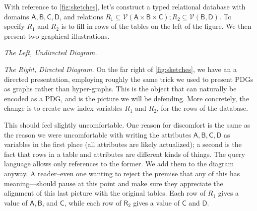 \documentclass{article}
\theoremstyle{plain}
\theoremstyle{definition}
\theoremstyle{remark}
\newcommand{\var}[1]{\mathsf{#1}}
\begin{document}
\begin{example}
    With reference to \cref{fig:sketches}, let's construct a typed relational database with domains $\var{A, B, C, D}$, and relations $R_1 \subseteq \mathcal V(\var{A\times B \times C}); R_2 \subseteq \mathcal V(\var{B, D})$. To specify $R_1$ and $R_2$ is to fill in rows of the tables on the left of the figure. We then present two graphical illustrations.
    
    \textit{The Left, Undirected Diagram.}

    

    

    
    \textit{The Right, Directed Diagram.} On the far right of \cref{fig:sketches}, we have an a directed presentation, employing roughly the same trick we used to present PDGs as graphs rather than hyper-graphs. This is the object that can naturally be encoded as a PDG, and is the picture we will be defending. More concretely, the change is to create new index variables $R_1$ and $R_2$, for the rows of the database. 
    
    This should feel slightly uncomfortable. One reason for discomfort is the same as the reason we were uncomfortable with writing the attributes $\var{A,B,C,D}$ as variables in the first place (all attributes are likely actualized); a second is the fact that rows in a table and attributes are different kinds of things. The query language allows only references to the former. We add them to the diagram anyway.
    A reader--even one wanting to reject the premise that any of this has meaning---should pause at this point and make sure they appreciate the alignment of this last picture with the original tables. Each row of $R_1$ gives a value of $\var{A,B}$, and $\var C$, while each row of $\var R_2$ gives a value of $\var{C}$ and $\var D$. 
    

\end{example}
\end{document}
